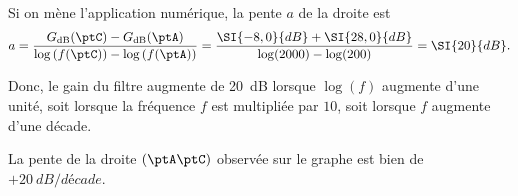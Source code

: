 
\begin{corrige}
	Si on mène l'application numérique, la pente $a$ de la droite est
	\[
		a = \frac{ G_{\text{dB}}(\ptC) - G_{\text{dB}}(\ptA) }{ \log\left( f(\ptC) \right) - \log\left( f(\ptA) \right)}
		= \frac{\SI{-8,0}{dB} + \SI{28,0}{dB}}{ \log(2000) - \log(200) } = \SI{20}{dB}.
	\]

\initialisationPartieGauche %

Donc, le gain du filtre augmente de \SI{20}{dB} lorsque $\log(f)$ augmente d'une unité, soit lorsque la fréquence $f$ est multipliée par $10$, soit lorsque $f$ augmente d'une décade.

La pente de la droite  $(\ptA\ptC)$  observée sur le graphe est bien de $+\SI{20}{dB/décade}$.


\initialisationPartieDroite %
%  


\end{corrige}
